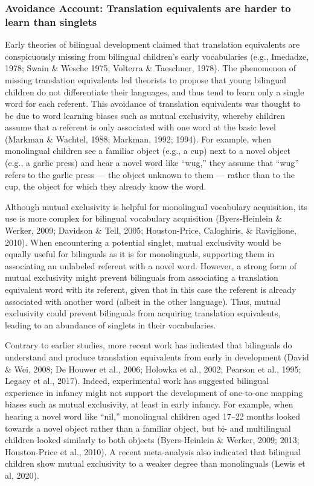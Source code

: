 \documentclass[
  english,
  ,man,floatsintext]{apa6}
\begin{document}
\hypertarget{avoidance-account-translation-equivalents-are-harder-to-learn-than-singlets}{%
\subsubsection{Avoidance Account: Translation equivalents are harder to learn than singlets}\label{avoidance-account-translation-equivalents-are-harder-to-learn-than-singlets}}

Early theories of bilingual development claimed that translation equivalents are conspicuously missing from bilingual children's early vocabularies (e.g., Imedadze, 1978; Swain \& Wesche 1975; Volterra \& Taeschner, 1978). The phenomenon of missing translation equivalents led theorists to propose that young bilingual children do not differentiate their languages, and thus tend to learn only a single word for each referent. This avoidance of translation equivalents was thought to be due to word learning biases such as mutual exclusivity, whereby children assume that a referent is only associated with one word at the basic level (Markman \& Wachtel, 1988; Markman, 1992; 1994). For example, when monolingual children see a familiar object (e.g., a cup) next to a novel object (e.g., a garlic press) and hear a novel word like ``wug,'' they assume that ``wug'' refers to the garlic press --- the object unknown to them --- rather than to the cup, the object for which they already know the word.

Although mutual exclusivity is helpful for monolingual vocabulary acquisition, its use is more complex for bilingual vocabulary acquisition (Byers-Heinlein \& Werker, 2009; Davidson \& Tell, 2005; Houston-Price, Caloghiris, \& Raviglione, 2010). When encountering a potential singlet, mutual exclusivity would be equally useful for bilinguals as it is for monolinguals, supporting them in associating an unlabeled referent with a novel word. However, a strong form of mutual exclusivity might prevent bilinguals from associating a translation equivalent word with its referent, given that in this case the referent is already associated with another word (albeit in the other language). Thus, mutual exclusivity could prevent bilinguals from acquiring translation equivalents, leading to an abundance of singlets in their vocabularies.

Contrary to earlier studies, more recent work has indicated that bilinguals do understand and produce translation equivalents from early in development (David \& Wei, 2008; De Houwer et al., 2006; Holowka et al., 2002; Pearson et al., 1995; Legacy et al., 2017). Indeed, experimental work has suggested bilingual experience in infancy might not support the development of one-to-one mapping biases such as mutual exclusivity, at least in early infancy. For example, when hearing a novel word like ``nil,'' monolingual children aged 17--22 months looked towards a novel object rather than a familiar object, but bi- and multilingual children looked similarly to both objects (Byers-Heinlein \& Werker, 2009; 2013; Houston-Price et al., 2010). A recent meta-analysis also indicated that bilingual children show mutual exclusivity to a weaker degree than monolinguals (Lewis et al, 2020).
\end{document}

